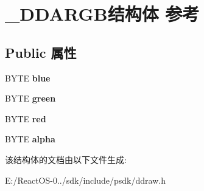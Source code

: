 \hypertarget{struct___d_d_a_r_g_b}{}\section{\+\_\+\+D\+D\+A\+R\+G\+B结构体 参考}
\label{struct___d_d_a_r_g_b}
\subsection*{Public 属性}
\begin{DoxyCompactItemize}
\item 
\mbox{\label{struct___d_d_a_r_g_b_a8cafe3fe2379ef6e24048fa05ee91312}} 
B\+Y\+TE {\bfseries blue}
\item 
\mbox{\label{struct___d_d_a_r_g_b_acd6bada0d2ec1d403e5bf56e4483b1e1}} 
B\+Y\+TE {\bfseries green}
\item 
\mbox{\label{struct___d_d_a_r_g_b_a81095353a4872b41a6749c1cf3c887f1}} 
B\+Y\+TE {\bfseries red}
\item 
\mbox{\label{struct___d_d_a_r_g_b_a160ba267429e53b2c7da2cb7105c12c9}} 
B\+Y\+TE {\bfseries alpha}
\end{DoxyCompactItemize}


该结构体的文档由以下文件生成\+:\begin{DoxyCompactItemize}
\item 
E\+:/\+React\+O\+S-\/0../sdk/include/psdk/ddraw.\+h\end{DoxyCompactItemize}
